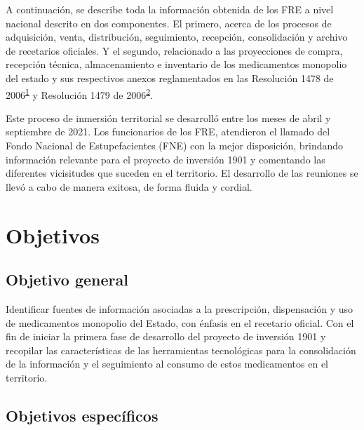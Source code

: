 \documentclass[
]{book}
\begin{document}
A continuación, se describe toda la información obtenida de los FRE a nivel nacional descrito en dos componentes. El primero, acerca de los procesos de adquisición, venta, distribución, seguimiento, recepción, consolidación y archivo de recetarios oficiales. Y el segundo, relacionado a las proyecciones de compra, recepción técnica, almacenamiento e inventario de los medicamentos monopolio del estado y sus respectivos anexos reglamentados en las Resolución 1478 de 2006\textsuperscript{\protect\hyperlink{ref-MSPS1478-2006}{1}} y Resolución 1479 de 2006\textsuperscript{\protect\hyperlink{ref-MSPS1479-2006}{2}}.

Este proceso de inmersión territorial se desarrolló entre los meses de abril y septiembre de 2021. Los funcionarios de los FRE, atendieron el llamado del Fondo Nacional de Estupefacientes (FNE) con la mejor disposición, brindando información relevante para el proyecto de inversión 1901 y comentando las diferentes vicisitudes que suceden en el territorio. El desarrollo de las reuniones se llevó a cabo de manera exitosa, de forma fluida y cordial.

\hypertarget{objetivos}{%
\chapter{Objetivos}\label{objetivos}}

\hypertarget{objetivo-general}{%
\section{Objetivo general}\label{objetivo-general}}

Identificar fuentes de información asociadas a la prescripción, dispensación y uso de medicamentos monopolio del Estado, con énfasis en el recetario oficial. Con el fin de iniciar la primera fase de desarrollo del proyecto de inversión 1901 y recopilar las características de las herramientas tecnológicas para la consolidación de la información y el seguimiento al consumo de estos medicamentos en el territorio.

\hypertarget{objetivos-especuxedficos}{%
\section{Objetivos específicos}\label{objetivos-especuxedficos}}
\end{document}
